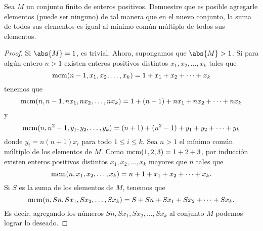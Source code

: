 
\begin{probMG}
  Sea $M$ un conjunto finito de enteros positivos. Demuestre que es posible
  agregarle elementos (puede ser ninguno) de tal manera que en el nuevo
  conjunto, la suma de todos sus elementos es igual al mínimo común múltiplo de
  todos sus elementos.
\end{probMG}

\begin{proof}
  Si $\abs{M}=1$, es trivial. Ahora, supongamos que $\abs{M}>1$. Si para algún
  entero $n>1$ existen enteros positivos distintos $x_1,x_2,\dots,x_k$ tales que
  \[\operatorname{mcm}(n-1,x_1,x_2,\dots,x_k)=1+x_1+x_2+\dots+x_k\]
  tenemos que
  \[\operatorname{mcm}(n,n-1,nx_1,nx_2,\dots,nx_k)=1+(n-1)+nx_1+nx_2+\dots+nx_k\]
  y
  \[\operatorname{mcm}(n,n^2-1,y_1,y_2,\dots,y_k)=(n+1)+(n^2-1)+y_1+y_2+\dots+y_k\]
  donde $y_i=n(n+1)x_i$ para todo $1\le i\le k$. Sea $n>1$ el mínimo común
  múltiplo de los elementos de $M$. Como $\operatorname{mcm}(1,2,3)=1+2+3$, por inducción
  existen enteros positivos distintos $x_1,x_2,\dots,x_k$ mayores que $n$ tales
  que
  \[\operatorname{mcm}(n,x_1,x_2,\dots,x_k)=n+1+x_1+x_2+\dots+x_k.\]
  Si $S$ es la suma de los elementos de $M$, tenemos que
  \[\operatorname{mcm}(n,Sn,Sx_1,Sx_2,\dots,Sx_k)=S+Sn+Sx_1+Sx_2+\dots+Sx_k.\]
  Es decir, agregando los números $Sn,Sx_1,Sx_2,\dots,Sx_k$ al conjunto $M$
  podemos lograr lo deseado.
\end{proof}
